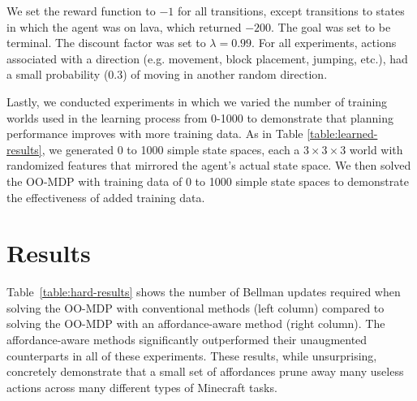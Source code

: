 \documentclass[letterpaper]{article}
\begin{document}
We set the reward function to $-1$ for all transitions, except
transitions to states in which the agent was on lava, which returned 
$-200$. The goal was set to be terminal. The discount
factor was set to $\lambda = 0.99$. For all experiments, actions associated with
a direction (e.g. movement, block placement, jumping, etc.), had a small 
probability ($0.3$) of moving in another random direction.

Lastly, we conducted experiments in which we varied the number of training worlds
used in the learning process from 0-1000 to demonstrate that planning
performance improves with more training data. As in Table \ref{table:learned-results}, we generated 0 to 1000 simple state
spaces, each a $3\times3\times3$ world with randomized features that mirrored the agent's actual state space. We then solved
the OO-MDP with training data of 0 to 1000 simple state spaces to demonstrate the effectiveness of added training data.

\section{Results}
\label{sec:results}

Table~\ref{table:hard-results} shows the number of Bellman updates required when solving the OO-MDP with conventional methods (left column)
compared to solving the OO-MDP with an affordance-aware method (right column).  The
affordance-aware methods significantly outperformed their unaugmented
counterparts in all of these experiments. These
results, while unsurprising, concretely demonstrate that a small set of affordances prune away many useless actions across many different types of Minecraft tasks. 

\begin{table}
\centering

\caption{Expert Affordance Results: Avg. Number of Bellman Updates per converged policy}
\label{table:hard-results}
\end{table}
\end{document}
